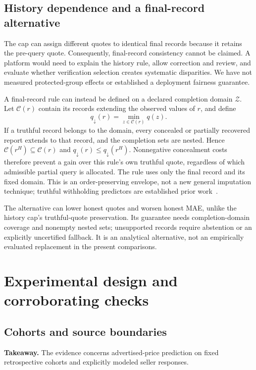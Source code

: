 \documentclass[11pt]{article}
\begin{document}
\subsection{History dependence and a final-record alternative}
The cap can assign different quotes to identical final records because it
retains the pre-query quote. Consequently, final-record consistency cannot
be claimed. A platform would need to explain the history rule, allow correction
and review, and evaluate whether verification selection creates systematic
disparities. We have not measured protected-group effects or established a
deployment fairness guarantee.

A final-record rule can instead be defined on a declared completion domain
$\mathcal Z$. Let $\mathcal C(r)$ contain its records extending the observed
values of $r$, and define
\[
 q_{\downarrow}(r)=\min_{z\in\mathcal C(r)}q(z).
\]
If a truthful record belongs to the domain, every concealed or partially
recovered report extends to that record, and the completion sets are nested.
Hence $\mathcal C(r^H)\subseteq\mathcal C(r)$ and
$q_{\downarrow}(r)\le q_{\downarrow}(r^H)$. Nonnegative concealment costs
therefore prevent a gain over this rule's own truthful quote, regardless of
which admissible partial query is allocated. The rule uses only the final
record and its fixed domain. This is an order-preserving envelope, not a new
general imputation technique; truthful withholding predictors are established
prior work~\cite{withheld,smi}.

The alternative can lower honest quotes and worsen honest MAE, unlike the
history cap's truthful-quote preservation. Its guarantee needs completion-domain
coverage and nonempty nested sets; unsupported records require abstention or
an explicitly uncertified fallback. It is an analytical alternative, not an
empirically evaluated replacement in the present comparisons.

\section{Experimental design and corroborating checks}\label{sec:experiment_setup}
\subsection{Cohorts and source boundaries}
\noindent\textbf{Takeaway.} The evidence concerns advertised-price prediction
on fixed retrospective cohorts and explicitly modeled seller responses.
\end{document}

